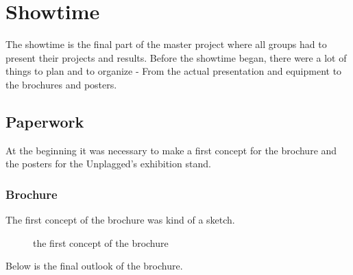 \chapter{Showtime}\label{chap:Showtime}

The showtime is the final part of the master project where all groups had to present their projects and results.
Before the showtime began, there were a lot of things to plan and to organize - From the actual presentation and equipment to the brochures and posters. 

\section{Paperwork}
At the beginning it was necessary to make a first concept for the brochure and the posters for the Unplagged's exhibition stand.

\pagebreak

\subsection{Brochure}
The first concept of the brochure was kind of a sketch.

\begin{figure}[!h]
  \centering
  \caption{the first concept of the brochure}
  \label{fig:brochure_sketch}
\end{figure}
\pagebreak
Below is the final outlook of the brochure.

